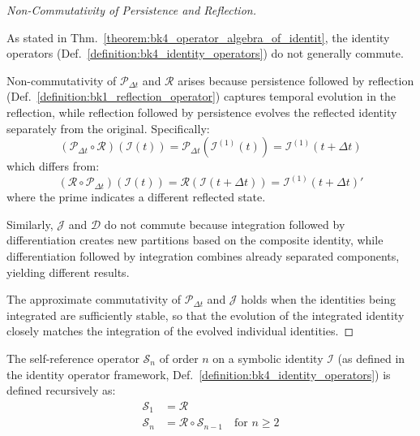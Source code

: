 \begin{proof}[Non-Commutativity of Persistence and Reflection]
\label{proof:bk4_persistence_reflection_noncommutativity}
\leavevmode

As stated in Thm.~\ref{theorem:bk4_operator_algebra_of_identit}, the identity operators
(Def.~\ref{definition:bk4_identity_operators}) do not generally commute.

Non-commutativity of $\mathcal{P}_{\Delta t}$ and $\mathcal{R}$ arises because
persistence followed by reflection
(Def.~\ref{definition:bk1_reflection_operator}) captures temporal evolution in
the reflection, while reflection followed by persistence evolves the reflected
identity separately from the original. Specifically:
\begin{equation}
    (\mathcal{P}_{\Delta t} \circ \mathcal{R})(\mathcal{I}(t)) = \mathcal{P}_{\Delta t}(\mathcal{I}^{(1)}(t)) = \mathcal{I}^{(1)}(t + \Delta t)
\end{equation}
which differs from:
\begin{equation}
    (\mathcal{R} \circ \mathcal{P}_{\Delta t})(\mathcal{I}(t)) = \mathcal{R}(\mathcal{I}(t + \Delta t)) = \mathcal{I}^{(1)}(t + \Delta t)'
\end{equation}
where the prime indicates a different reflected state.

Similarly, $\mathcal{J}$ and $\mathcal{D}$ do not commute because integration followed by differentiation creates new partitions based on the composite identity, while differentiation followed by integration combines already separated components, yielding different results.

The approximate commutativity of $\mathcal{P}_{\Delta t}$ and $\mathcal{J}$ holds when the identities being integrated are sufficiently stable, so that the evolution of the integrated identity closely matches the integration of the evolved individual identities.
\end{proof}
\begin{definition}
\label{definition:bk4_self_reference_operator}
The self-reference operator $\mathcal{S}_n$ of order $n$ on a symbolic identity $\mathcal{I}$ (as defined in the identity operator framework, Def.~\ref{definition:bk4_identity_operators}) is defined recursively as:
\begin{align}
    \mathcal{S}_1 &= \mathcal{R} \\
    \mathcal{S}_n &= \mathcal{R} \circ \mathcal{S}_{n-1} \quad \text{for } n \geq 2
\end{align}
\end{definition}
